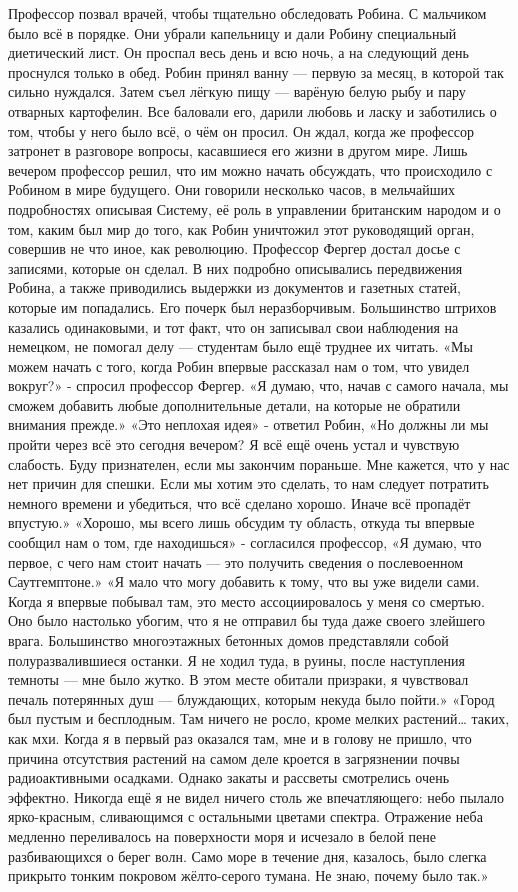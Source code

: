 \documentclass[a4paper,12pt]{book}
\begin{document}
	Профессор позвал врачей, чтобы тщательно обследовать Робина. С мальчиком было всё в порядке. Они убрали капельницу и дали Робину специальный диетический лист. Он проспал весь день и всю ночь, а на следующий день проснулся только в обед. Робин принял ванну — первую за месяц, в которой так сильно нуждался. Затем съел лёгкую пищу — варёную белую рыбу и пару отварных картофелин.
	Все баловали его, дарили любовь и ласку и заботились о том, чтобы у него было всё, о чём он просил. Он ждал, когда же профессор затронет в разговоре вопросы, касавшиеся его жизни в другом мире. Лишь вечером профессор решил, что им можно начать обсуждать, что происходило с Робином в мире будущего. Они говорили несколько часов, в мельчайших подробностях описывая Систему, её роль в управлении британским народом и о том, каким был мир до того, как Робин уничтожил этот руководящий орган, совершив не что иное, как революцию.
	Профессор Фергер достал досье с записями, которые он сделал. В них подробно описывались передвижения Робина, а также приводились выдержки из документов и газетных статей, которые им попадались. Его почерк был неразборчивым. Большинство штрихов казались одинаковыми, и тот факт, что он записывал свои наблюдения на немецком, не помогал делу — студентам было ещё труднее их читать.
	«Мы можем начать с того, когда Робин впервые рассказал нам о том, что увидел вокруг?» - спросил профессор Фергер.
	«Я думаю, что, начав с самого начала, мы сможем добавить любые дополнительные детали, на которые не обратили внимания прежде.»
	«Это неплохая идея» - ответил Робин,
	«Но должны ли мы пройти через всё это сегодня вечером? Я всё ещё очень устал и чувствую слабость. Буду признателен, если мы закончим пораньше. Мне кажется, что у нас нет причин для спешки. Если мы хотим это сделать, то нам следует потратить немного времени и убедиться, что всё сделано хорошо. Иначе всё пропадёт впустую.»
	«Хорошо, мы всего лишь обсудим ту область, откуда ты впервые сообщил нам о том, где находишься» - согласился профессор,
	«Я думаю, что первое, с чего нам стоит начать — это получить сведения о послевоенном Саутгемптоне.»
	«Я мало что могу добавить к тому, что вы уже видели сами. Когда я впервые побывал там, это место ассоциировалось у меня со смертью. Оно было настолько убогим, что я не отправил бы туда даже своего злейшего врага. Большинство многоэтажных бетонных домов представляли собой полуразвалившиеся останки. Я не ходил туда, в руины, после наступления темноты — мне было жутко. В этом месте обитали призраки, я чувствовал печаль потерянных душ — блуждающих, которым некуда было пойти.»
	«Город был пустым и бесплодным. Там ничего не росло, кроме мелких растений… таких, как мхи. Когда я в первый раз оказался там, мне и в голову не пришло, что причина отсутствия растений на самом деле кроется в загрязнении почвы радиоактивными осадками. Однако закаты и рассветы смотрелись очень эффектно. Никогда ещё я не видел ничего столь же впечатляющего: небо пылало ярко-красным, сливающимся с остальными цветами спектра. Отражение неба медленно переливалось на поверхности моря и исчезало в белой пене разбивающихся о берег волн. Само море в течение дня, казалось, было слегка прикрыто тонким покровом жёлто-серого тумана. Не знаю, почему было так.»
\end{document}
